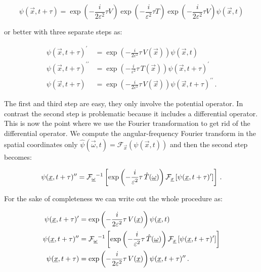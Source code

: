 \begin{equation*}
  \psi(\vec{x}, t+\tau)
  =
  \exp\left(-\frac{i}{2\varepsilon^2} \tau V\right)
  \exp\left(-\frac{i}{\varepsilon^2} \tau T\right)
  \exp\left(-\frac{i}{2\varepsilon^2} \tau V\right)
  \psi(\vec{x},t)
\end{equation*}

or better with three separate steps as:

\begin{equation}
\begin{split}
  \psi(\vec{x}, t+\tau)^{\prime} & = \exp\left(-\frac{i}{2\varepsilon^2} \tau \, V(\vec{x})\right) \psi(\vec{x},t) \\
  \psi(\vec{x}, t+\tau)^{\prime\prime} & = \exp\left(-\frac{i}{\varepsilon^2} \tau \, T(\vec{x})\right) \psi(\vec{x}, t+\tau)^{\prime} \\
  \psi(\vec{x}, t+\tau) & = \exp\left(-\frac{i}{2\varepsilon^2} \tau \, V(\vec{x})\right) \psi(\vec{x}, t+\tau)^{\prime\prime} \,.
\end{split}
\end{equation}

The first and third step are easy, they only involve the potential operator.
In contrast the second step is problematic because it includes a differential
operator. This is now the point where we use the Fourier transformation to
get rid of the differential operator. We compute the angular-frequency
Fourier transform in the spatial coordinates only
$\hat{\psi}(\vec{\omega}, t) = \mathcal{F}_{\vec{x}}\left(\psi(\vec{x},t)\right)$
and then the second step becomes:

\begin{equation}
  \psi(\underline{x}, t+\tau)^{\prime\prime} =
  \mathcal{F}_{\underline{\omega}}{}^{-1} \left[
    \exp\left(-\frac{i}{\varepsilon^2} \tau \, \hat{T}(\underline{\omega})\right)
    \mathcal{F}_{\underline{x}} \left[
      \psi(\underline{x}, t+\tau)^{\prime}
    \right]
  \right] \,.
\end{equation}

For the sake of completeness we can write out the whole procedure as:

\begin{equation} \label{eq:fourier_propagator}
\begin{split}
  \psi(\underline{x}, t+\tau)^{\prime} & = \exp\left(-\frac{i}{2\varepsilon^2} \tau \, V(\underline{x})\right) \psi(\underline{x},t) \\
  \psi(\underline{x}, t+\tau)^{\prime\prime} & =
  \mathcal{F}_{\underline{\omega}}{}^{-1} \left[
    \exp\left(-\frac{i}{\varepsilon^2} \tau \, \hat{T}(\underline{\omega})\right)
    \mathcal{F}_{\underline{x}} \left[
      \psi(\underline{x}, t+\tau)^{\prime}
    \right]
  \right] \\
  \psi(\underline{x}, t+\tau) & = \exp\left(-\frac{i}{2\varepsilon^2} \tau \, V(\underline{x})\right) \psi(\underline{x}, t+\tau)^{\prime\prime} \,.
\end{split}
\end{equation}

